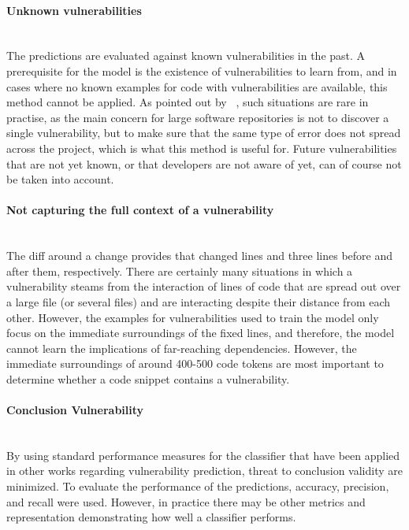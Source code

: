 \documentclass[
	a4paper,
	pagesize,
	pdftex,
	12pt,
	twoside, %
	BCOR=5mm, %
	ngerman,
	fleqn,
	final,
	]{scrartcl}
\begin{document}
\paragraph{Unknown vulnerabilities}\mbox{}\\
The predictions are evaluated against known vulnerabilities in the past. A prerequisite for the model is the existence of vulnerabilities to learn from, and in cases where no known examples for code with vulnerabilities are available, this method cannot be applied. As pointed out by ~\cite{Yamaguchi.2012}, such situations are rare in practise, as the main concern for large software repositories is not to discover a single vulnerability, but to make sure that the same type of error does not spread across the project, which is what this method is useful for. Future vulnerabilities that are not yet known, or that developers are not aware of yet, can of course not be taken into account.
\paragraph{Not capturing the full context of a vulnerability}\mbox{}\\
The diff around a change provides that changed lines and three lines before and after them, respectively. There are certainly many situations in which a vulnerability steams from the interaction of lines of code that are spread out over a large file (or several files) and are interacting despite their distance from each other. However, the examples for vulnerabilities used to train the model only focus on the immediate surroundings of the fixed lines, and therefore, the model cannot learn the implications of far-reaching dependencies. However, the immediate surroundings of around 400-500 code tokens are most important to determine whether a code snippet contains a vulnerability. %
\paragraph{Conclusion Vulnerability}\mbox{}\\
By using standard performance measures for the classifier that have been applied in other works regarding vulnerability prediction, threat to conclusion validity are minimized. To evaluate the performance of the predictions, accuracy, precision, and recall were used. However, in practice there may be other metrics and representation demonstrating how well a classifier performs.
\end{document}
